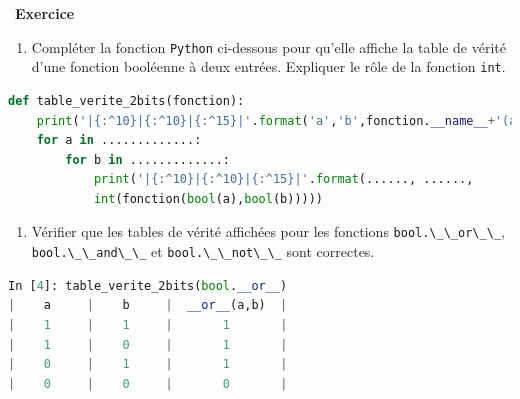 \documentclass[
  11pt,
]{article}
\newcommand{\passthrough}[1]{#1}
\providecommand{\tightlist}{%
  \setlength{\itemsep}{0pt}\setlength{\parskip}{0pt}}
\newcounter{exo}
\newenvironment{exercice}[1]
{\par \medskip   \addtocounter{exo}{1} \noindent  
\begin{bclogo}[arrondi =0.1,   noborder = true, logo=\bccrayon, marge=4]{~\textbf{Exercice} \textbf{\theexo} {\itshape #1} }  \par}
{
\end{bclogo}
 \par \bigskip }
\newcounter{def}
\begin{document}
\begin{exercice}{}

\begin{enumerate}
\def\labelenumi{\arabic{enumi}.}
\tightlist
\item
  Compléter la fonction \passthrough{\lstinline!Python!} ci-dessous pour
  qu'elle affiche la table de vérité d'une fonction booléenne à deux
  entrées. Expliquer le rôle de la fonction
  \passthrough{\lstinline!int!}.
\end{enumerate}

\begin{lstlisting}[language=Python]
def table_verite_2bits(fonction):
    print('|{:^10}|{:^10}|{:^15}|'.format('a','b',fonction.__name__+'(a,b)'))
    for a in .............:
        for b in .............:
            print('|{:^10}|{:^10}|{:^15}|'.format(......, ......, 
            int(fonction(bool(a),bool(b)))))
\end{lstlisting}

\begin{enumerate}
\def\labelenumi{\arabic{enumi}.}
\tightlist
\item
  Vérifier que les tables de vérité affichées pour les fonctions
  \passthrough{\lstinline!bool.\_\_or\_\_!},
  \passthrough{\lstinline!bool.\_\_and\_\_!} et
  \passthrough{\lstinline!bool.\_\_not\_\_!} sont correctes.
\end{enumerate}

\begin{lstlisting}[language=Python]
In [4]: table_verite_2bits(bool.__or__)                                                                                                                                           
|    a     |    b     |  __or__(a,b)  |
|    1     |    1     |       1       |
|    1     |    0     |       1       |
|    0     |    1     |       1       |
|    0     |    0     |       0       |
\end{lstlisting}

\end{exercice}
\end{document}
